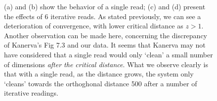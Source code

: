 \begin{figure}[h!]
  \centering


  \caption{(a) and (b) show the behavior of a single read; (c) and (d) present the effects of 6 iterative reads. As stated previously, we can see a deterioration of convergence, with lower critical distance as $z>1$.  Another observation can be made here, concerning the discrepancy of Kanerva's Fig 7.3 and our data.  It seems that Kanerva may not have considered that a single read would only `clean' a small number of dimensions \emph{after the critical distance}. What we observe clearly is that with a single read, as the distance grows, the system only `cleans' towards the orthoghonal distance 500 after a number of iterative readings.}
  \label{fig:murillo-generalization-experiments}
\end{figure}

